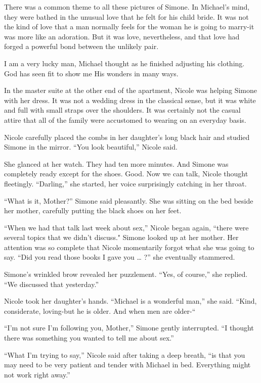 \documentclass[]{article}
\begin{document}
{There was a common theme to all these pictures of Simone.  In Michael’s mind, they were bathed in the unusual love that he felt for his child bride.  It was not the kind of love that a man normally feels for the woman he is going to marry-it was more like an adoration.  But it was love, nevertheless, and that love had forged a powerful bond between the unlikely pair.

I am a very lucky man, Michael thought as he finished adjusting his clothing.  God has seen fit to show me His wonders in many ways.

In the master suite at the other end of the apartment, Nicole was helping Simone with her dress.  It was not a wedding dress in the classical sense, but it was white and full with small straps over the shoulders.  It was certainly not the casual attire that all of the family were accustomed to wearing on an everyday basis.

Nicole carefully placed the combs in her daughter’s long black hair and studied Simone in the mirror.  “You look beautiful,” Nicole said.

She glanced at her watch.  They had ten more minutes.  And Simone was completely ready except for the shoes.  Good.  Now we can talk, Nicole thought fleetingly.  “Darling,” she started, her voice surprisingly catching in her throat.

“What is it, Mother?” Simone said pleasantly.  She was sitting on the bed beside her mother, carefully putting the black shoes on her feet.

“When we had that talk last week about sex,” Nicole began again, “there were several topics that we didn’t discuss."  Simone looked up at her mother.  Her attention was so complete that Nicole momentarily forgot what she was going to say.  “Did you read those books I gave you … ?” she eventually stammered.

Simone’s wrinkled brow revealed her puzzlement.  “Yes, of course,” she replied.  “We discussed that yesterday.”

Nicole took her daughter’s hands.  “Michael is a wonderful man,” she said.  “Kind, considerate, loving-but he is older.  And when men are older-“

“I’m not sure I’m following you, Mother,” Simone gently interrupted.  “I thought there was something you wanted to tell me about sex.”

“What I’m trying to say,” Nicole said after taking a deep breath, “is that you may need to be very patient and tender with Michael in bed.  Everything might not work right away.”

}
\end{document}
